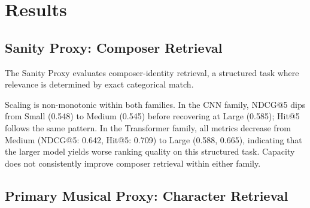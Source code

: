 \documentclass[sigconf]{acmart}
\begin{document}
\section{Results}\label{sec:results}\label{ch:results}
\subsection{Sanity Proxy: Composer Retrieval}

The Sanity Proxy evaluates composer-identity retrieval, a structured task where relevance is determined by exact categorical match.

\begin{table}[!htbp]
\centering
\caption{Sanity Proxy Results (Composer Retrieval). Metrics reported are corpus-level mean values at rank 5.}
\label{tab:sanity_results}
\end{table}

Scaling is non-monotonic within both families. In the CNN family, NDCG@5 dips from Small (0.548) to Medium (0.545) before recovering at Large (0.585); Hit@5 follows the same pattern. In the Transformer family, all metrics decrease from Medium (NDCG@5: 0.642, Hit@5: 0.709) to Large (0.588, 0.665), indicating that the larger model yields worse ranking quality on this structured task. Capacity does not consistently improve composer retrieval within either family.

\subsection{Primary Musical Proxy: Character Retrieval}
\end{document}
